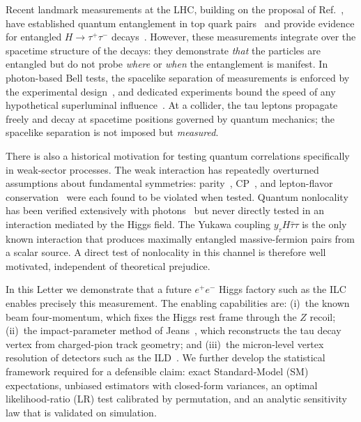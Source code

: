 \documentclass[prl,twocolumn,superscriptaddress,floatfix]{revtex4-2}
\newcommand{\ee}{e^+e^-}
\newcommand{\tautau}{\tau^+\tau^-}
\newcommand{\Htautau}{H\!\to\!\tautau}
\begin{document}
Recent landmark measurements at the
LHC, building on the proposal of Ref.~\cite{Afik2021}, have
established quantum entanglement in top quark
pairs~\cite{ATLAS_top2024,CMS_top2024} and provide evidence
for entangled $\Htautau$ decays~\cite{ATLAS_Htautau2024}.  However,
these measurements integrate over the spacetime structure of the
decays: they demonstrate \emph{that} the particles are entangled but
do not probe \emph{where} or \emph{when} the entanglement is manifest.
In photon-based Bell tests, the spacelike separation of measurements
is enforced by the experimental
design~\cite{Aspect1982,Hensen2015,BigBell2018}, and dedicated
experiments bound the speed of any hypothetical superluminal
influence~\cite{Salart2008}.  At a collider, the tau leptons propagate
freely and decay at spacetime positions governed by quantum mechanics;
the spacelike separation is not imposed but \emph{measured}.

There is also a historical motivation for testing quantum
correlations specifically in weak-sector processes.  The weak
interaction has repeatedly overturned assumptions about fundamental
symmetries: parity~\cite{LeeYang1956,Wu1957}, CP~\cite{CroninFitch1964},
and lepton-flavor conservation~\cite{SuperK1998} were each found to be
violated when tested.  Quantum nonlocality has been verified
extensively with photons~\cite{Aspect1982,Hensen2015,BigBell2018} but
never directly tested in an interaction mediated by the Higgs field.
The Yukawa coupling $y_\tau H\bar\tau\tau$ is the only known
interaction that produces maximally entangled massive-fermion pairs
from a scalar source.  A direct test of nonlocality in this channel is
therefore well motivated, independent of theoretical prejudice.

In this Letter we demonstrate that a future $\ee$ Higgs factory such
as the ILC~\cite{ILC_TDR} enables precisely this measurement.  The
enabling capabilities are: (i)~the known beam four-momentum, which
fixes the Higgs rest frame through the $Z$ recoil; (ii)~the
impact-parameter method of Jeans~\cite{Jeans2015}, which reconstructs
the tau decay vertex from charged-pion track geometry; and (iii)~the
micron-level vertex resolution of detectors such as the
ILD~\cite{ILD_IDR}.  We further develop the statistical framework
required for a defensible claim: exact Standard-Model (SM)
expectations, unbiased estimators with closed-form variances, an
optimal likelihood-ratio (LR) test calibrated by permutation, and an
analytic sensitivity law that is validated on simulation.

\end{document}
